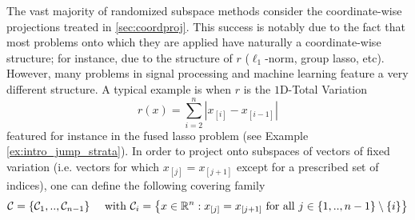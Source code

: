 The vast majority of randomized subspace methods consider the coordinate-wise projections treated in \ref{sec:coordproj}. This success is notably due to the fact that most problems onto which they are applied have naturally a coordinate-wise structure; for instance, due to the structure of $r$ ($\ell_1$-norm, group lasso, etc). However, many problems in signal processing and machine learning feature a very different structure. A typical example is when $r$ is the $1$D-Total Variation 
\begin{equation}\label{eq:TV}
    r(x) = \sum_{i=2}^n |x_{[i]}-x_{[i-1]}|
\end{equation}
featured for instance in the fused lasso problem \cite{tibshirani2005sparsity} (see Example \ref{ex:intro_jump_strata}). In order to project onto subspaces of vectors of fixed variation (i.e. vectors for which $x_{[j]} = x_{[j+1]}$ except for a prescribed set of indices), one can define the following covering family 
{
$$ \mathcal{C} = \{\mathcal{C}_1,..,\mathcal{C}_{n-1}\} \quad\text{ with } \mathcal{C}_i = \left\{x\in\mathbb{R}^n  : x_{[j]} = x_{[j+1]} \text{ for all } j\in \{1,..,n-1\}\setminus\{i\}  \right\} $$ }
